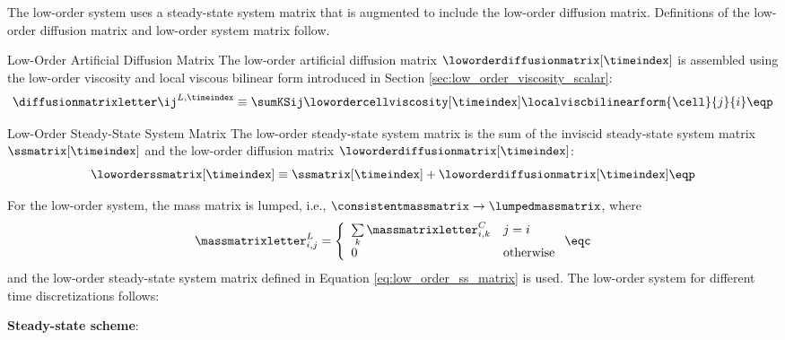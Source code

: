 The low-order system uses a steady-state system matrix that is augmented
to include the low-order diffusion matrix. Definitions of the low-order
diffusion matrix and low-order system matrix follow.
\begin{definition}{Low-Order Artificial Diffusion Matrix}
   The low-order artificial diffusion matrix $\loworderdiffusionmatrix[\timeindex]$
   is assembled using the low-order viscosity and local viscous bilinear
   form introduced in Section \ref{sec:low_order_viscosity_scalar}:
   \begin{equation}\label{eq:low_order_diffusion_matrix}
     \diffusionmatrixletter\ij^{L,\timeindex} \equiv
       \sumKSij\lowordercellviscosity[\timeindex]
       \localviscbilinearform{\cell}{j}{i} \eqp
   \end{equation}
\end{definition}
\begin{definition}{Low-Order Steady-State System Matrix}
   The low-order steady-state system matrix is the sum of the inviscid 
   steady-state system matrix $\ssmatrix[\timeindex]$ and the low-order diffusion
   matrix $\loworderdiffusionmatrix[\timeindex]$:
   \begin{equation}\label{eq:low_order_ss_matrix}
      \loworderssmatrix[\timeindex] \equiv
        \ssmatrix[\timeindex] + \loworderdiffusionmatrix[\timeindex] \eqp
   \end{equation}
\end{definition}
For the low-order system, the mass matrix is lumped, i.e.,
$\consistentmassmatrix\rightarrow\lumpedmassmatrix$, where
\begin{equation}
  \massmatrixletter^L_{i,j} = \left\{\begin{array}{l l}
    \sum\limits_k \massmatrixletter^C_{i,k} & j = i\\
    0                                       & \mbox{otherwise}
    \end{array}\right.
    \eqc
\end{equation}
and the low-order
steady-state system matrix defined in Equation \eqref{eq:low_order_ss_matrix}
is used. The low-order system for different time discretizations follows:
\begin{center}{\textbf{Steady-state scheme}:}\end{center}
